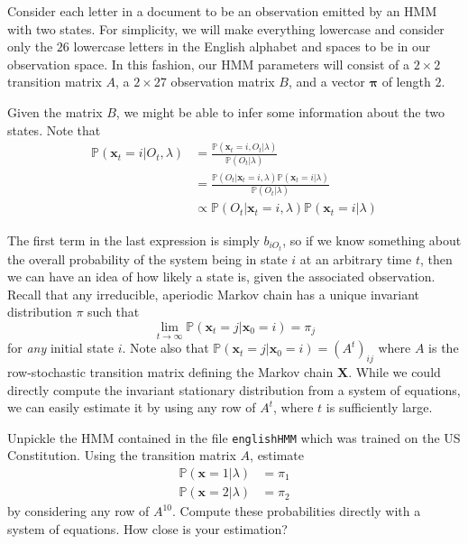 
Consider each letter in a document to be an observation emitted by an HMM with two states. For simplicity, we will make everything lowercase and consider only the $26$ lowercase letters in the English alphabet and spaces to be in our observation space. In this fashion, our HMM parameters will consist of a $2 \times 2$ transition matrix $A$, a $2 \times 27$ observation matrix $B$, and a vector $\mathbf{\pi}$ of length $2$.

Given the matrix $B$, we might be able to infer some information about the two states. Note that
\begin{align*}
\mathbb{P}(\mathbf{x}_{t} = i | O_{t},\lambda) & = \frac{\mathbb{P}(\mathbf{x}_{t} = i, O_{t} | \lambda)}{\mathbb{P}(O_{t} | \lambda)} \\
& = \frac{\mathbb{P}(O_{t} | \mathbf{x}_{t} = i, \lambda) \mathbb{P}(\mathbf{x}_{t} = i | \lambda)}{\mathbb{P}(O_{t} | \lambda)} \\
& \propto \mathbb{P}(O_{t} | \mathbf{x}_{t} = i, \lambda) \mathbb{P}(\mathbf{x}_{t} = i| \lambda)
\end{align*}

The first term in the last expression is simply $b_{iO_{t}}$, so if we know something about the overall probability of the system being in state $i$ at an arbitrary time $t$, then we can have an idea of how likely a state is, given the associated observation. Recall that any irreducible, aperiodic Markov chain has a unique invariant distribution $\pi$ such that
\begin{equation*}
\lim_{t \rightarrow \infty} \mathbb{P}(\mathbf{x}_{t} = j | \mathbf{x}_{0} = i) = \pi_{j}
\end{equation*}
for \emph{any} initial state $i$. Note also that $\mathbb{P}(\mathbf{x}_{t} = j | \mathbf{x}_{0} = i) = (A^{t})_{ij}$ where $A$ is the row-stochastic transition matrix defining the Markov chain $\mathbf{X}$. While we could directly compute the invariant stationary distribution from a system of equations, we can easily estimate it by using any row of $A^{t}$, where $t$ is sufficiently large.

\begin{problem}
Unpickle the HMM contained in the file \texttt{englishHMM} which was trained on the US Constitution. Using the transition matrix $A$, estimate
\begin{align*}
\mathbb{P}(\mathbf{x} = 1 | \lambda) & = \pi_{1} \\
\mathbb{P}(\mathbf{x} = 2 | \lambda) & = \pi_{2}
\end{align*}
by considering any row of $A^{10}$. Compute these probabilities directly with a system of equations. How close is your estimation?
\end{problem}

